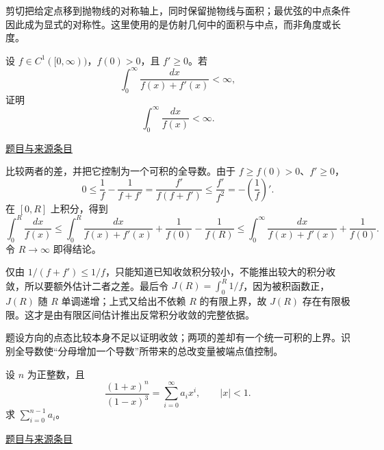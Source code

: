 \documentclass[12pt,fontset=fandol]{ctexart}
\begin{document}
\begin{remark}[方法与条件]剪切把给定点移到抛物线的对称轴上，同时保留抛物线与面积；最优弦的中点条件因此成为显式的对称性。这里使用的是仿射几何中的面积与中点，而非角度或长度。\end{remark}

\begin{example}[来源序号3]\label{ex:pre04-math:3}\label{pr:pre04-math:3}

设 $f\in C^1([0,\infty))$，$f(0)>0$，且 $f'\ge0$。若
\[
\int_0^\infty\frac{dx}{f(x)+f'(x)}<\infty,
\]
证明
\[
\int_0^\infty\frac{dx}{f(x)}<\infty.
\]

\par\href{https://github.com/lzxcr/cmc-mathematics/blob/64916fa1fdbc3e444a652eca204d5669058ee321/src/problems/preliminary/04/03.md}{题目与来源条目}

\end{example}

\begin{solve}\label{ans:pre04-math:3}

比较两者的差，并把它控制为一个可积的全导数。由于 $f\ge f(0)>0$、$f'\ge0$，
\[
0\le\frac1f-\frac1{f+f'}
=\frac{f'}{f(f+f')}
\le\frac{f'}{f^2}
=-\left(\frac1f\right)'.
\]
在 $[0,R]$ 上积分，得到
\[
\int_0^R\frac{dx}{f(x)}
\le\int_0^R\frac{dx}{f(x)+f'(x)}
+\frac1{f(0)}-\frac1{f(R)}
\le\int_0^\infty\frac{dx}{f(x)+f'(x)}+\frac1{f(0)}.
\]
令 $R\to\infty$ 即得结论。

仅由 $1/(f+f')\le1/f$，只能知道已知收敛积分较小，不能推出较大的积分收敛，所以要额外估计二者之差。最后令 $J(R)=\int_0^R1/f$，因为被积函数正，$J(R)$ 随 $R$ 单调递增；上式又给出不依赖 $R$ 的有限上界，故 $J(R)$ 存在有限极限。这才是由有限区间估计推出反常积分收敛的完整依据。

\end{solve}

\begin{remark}[方法与条件]题设方向的点态比较本身不足以证明收敛；两项的差却有一个统一可积的上界。识别全导数使“分母增加一个导数”所带来的总改变量被端点值控制。\end{remark}

\begin{example}[来源序号5]\label{ex:pre04-math:5}\label{pr:pre04-math:5}

设 $n$ 为正整数，且
\[
\frac{(1+x)^n}{(1-x)^3}=\sum_{i=0}^\infty a_ix^i,
\qquad |x|<1.
\]
求 $\sum_{i=0}^{n-1}a_i$。

\par\href{https://github.com/lzxcr/cmc-mathematics/blob/64916fa1fdbc3e444a652eca204d5669058ee321/src/problems/preliminary/04/05.md}{题目与来源条目}

\end{example}
\end{document}
